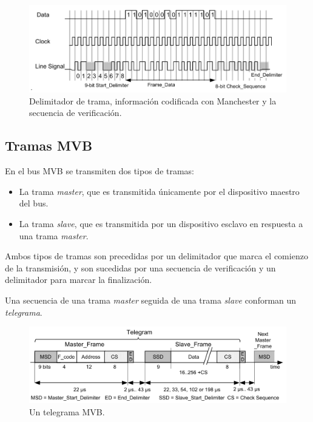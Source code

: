 \begin{figure}[htbp]
	\centering
	\includegraphics[width=1\textwidth]{./Figures/manchester.png}
	\caption[Delimitador de trama, información codificada con Manchester y la secuencia de verificación]{Delimitador de trama, información codificada con Manchester y la secuencia de verificación.
        \\ }
\end{figure}

\subsection{Tramas MVB}

En el bus MVB se transmiten dos tipos de tramas:

\begin{itemize}
\item La trama \textit{master}, que es transmitida únicamente por el dispositivo maestro del bus.
\item La trama \textit{slave}, que es transmitida por un dispositivo esclavo en respuesta a una trama \textit{master}.
\end{itemize}

Ambos tipos de tramas son precedidas por un delimitador que marca el comienzo de la transmisión, y son sucedidas por una secuencia de verificación y un delimitador para marcar la finalización.

Una secuencia de una trama \textit{master} seguida de una trama \textit{slave} conforman un \textit{telegrama}.

\begin{figure}[htbp]
	\centering
	\includegraphics[width=1\textwidth]{./Figures/telegrama.png}
	\caption[Un telegrama MVB]{Un telegrama MVB.
        \\ }
\end{figure}

